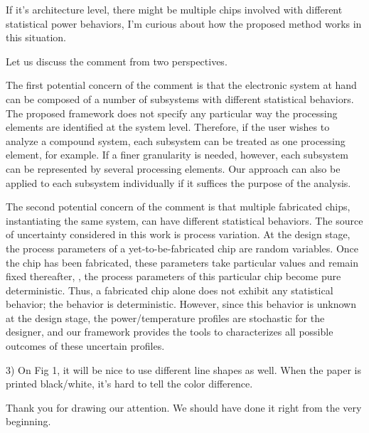 \begin{reviewer}
If it’s architecture level, there might be multiple chips involved with different statistical power behaviors, I’m curious about how the proposed method works in this situation.
\end{reviewer}
\begin{authors}
Let us discuss the comment from two perspectives.

The first potential concern of the comment is that the electronic system at hand can be composed of a number of subsystems with different statistical behaviors.
The proposed framework does not specify any particular way the processing elements are identified at the system level.
Therefore, if the user wishes to analyze a compound system, each subsystem can be treated as one processing element, for example.
If a finer granularity is needed, however, each subsystem can be represented by several processing elements.
Our approach can also be applied to each subsystem individually if it suffices the purpose of the analysis.

The second potential concern of the comment is that multiple fabricated chips, instantiating the same system, can have different statistical behaviors.
The source of uncertainty considered in this work is process variation.
At the design stage, the process parameters of a yet-to-be-fabricated chip are random variables.
Once the chip has been fabricated, these parameters take particular values and remain fixed thereafter, \ie, the process parameters of this particular chip become pure deterministic.
Thus, a fabricated chip alone does not exhibit any statistical behavior; the behavior is deterministic.
However, since this behavior is unknown at the design stage, the power/temperature profiles are stochastic for the designer, and our framework provides the tools to characterizes all possible outcomes of these uncertain profiles.

\begin{actions}
\end{actions}
\end{authors}

\begin{reviewer}
3) On Fig 1, it will be nice to use different line shapes as well. When the paper is printed black/white, it’s hard to tell the color difference.
\end{reviewer}
\begin{authors}
Thank you for drawing our attention.
We should have done it right from the very beginning.

\begin{actions}
\end{actions}
\end{authors}
